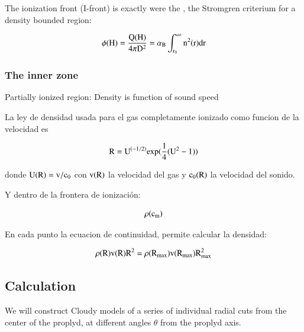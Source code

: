 \documentclass{article}
\begin{document}
The ionization front (I-front) is exactly were the , the Stromgren criterium for a density bounded region:

\begin{equation}
  \rm \phi(H) = \frac{Q(H)}{4\pi D^2} =\alpha_B \int^{\infty}_{r_0}n^2(r) dr
\end{equation}

\subsubsection{The inner zone}
\label{cap:inner}

Partially ionized region: Density is function of sound speed

La ley de densidad usada para el gas completamente ionizado como funcion de la velocidad es

\begin{equation}
  \rm R = U^{(-1/2)} exp (\frac{1}{4} (U^2 -1))
\end{equation}

donde $\rm U(R) = v / c_0$ con $\rm v(R)$ la velocidad del gas y $\rm c_0(R)$ la velocidad del sonido.



Y dentro de la frontera de ionización:

\begin{equation}
  \rm \rho(c_m)
\end{equation}

En cada punto la ecuacion de continuidad, permite calcular la densidad:

\begin{equation}
  \rm \rho (R) v(R) R^2 = \rho (R_{max}) v(R_{max}) R_{max}^2
\end{equation}

\subsection{Calculation}
\label{cap:calculation}

We will construct Cloudy models of a series of individual radial cuts from the center of the proplyd, at different angles $\theta$ from the proplyd axis.




\end{document}
